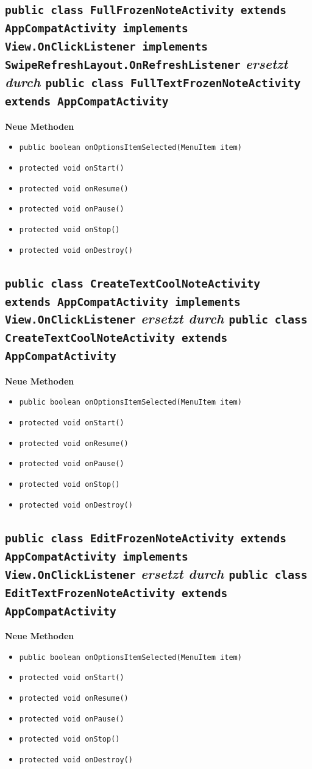 \documentclass[a4paper]{scrreprt}
\begin{document}
		\subsection{\texttt{public class FullFrozenNoteActivity extends AppCompatActivity implements View.OnClickListener implements SwipeRefreshLayout.OnRefreshListener} \textit{ersetzt durch} \texttt{public class FullTextFrozenNoteActivity extends AppCompatActivity}}
			\textbf{Neue Methoden}
			\begin{itemize}
				\item \texttt{public boolean onOptionsItemSelected(MenuItem item)}
				\item \texttt{protected void onStart()}
				\item \texttt{protected void onResume()}
				\item \texttt{protected void onPause()}
				\item \texttt{protected void onStop()}
				\item \texttt{protected void onDestroy()}
			\end{itemize}
		\subsection{\texttt{public class CreateTextCoolNoteActivity extends AppCompatActivity implements View.OnClickListener} \textit{ersetzt durch} \texttt{public class CreateTextCoolNoteActivity extends AppCompatActivity}}
			\textbf{Neue Methoden}
			\begin{itemize}
				\item \texttt{public boolean onOptionsItemSelected(MenuItem item)}
				\item \texttt{protected void onStart()}
				\item \texttt{protected void onResume()}
				\item \texttt{protected void onPause()}
				\item \texttt{protected void onStop()}
				\item \texttt{protected void onDestroy()}
			\end{itemize}
		\subsection{\texttt{public class EditFrozenNoteActivity extends AppCompatActivity implements View.OnClickListener} \textit{ersetzt durch} \texttt{public class EditTextFrozenNoteActivity extends AppCompatActivity}}
		\textbf{Neue Methoden}
		\begin{itemize}
			\item \texttt{public boolean onOptionsItemSelected(MenuItem item)}
			\item \texttt{protected void onStart()}
			\item \texttt{protected void onResume()}
			\item \texttt{protected void onPause()}
			\item \texttt{protected void onStop()}
			\item \texttt{protected void onDestroy()}
		\end{itemize}
		
\end{document}
